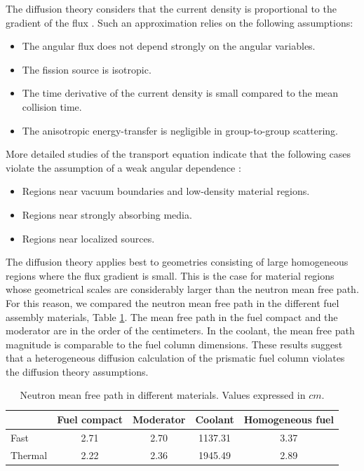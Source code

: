 \documentclass[11pt,letterpaper]{article}
\begin{document}
The diffusion theory considers that the current density is proportional to the gradient of the flux \cite{leppanen_development_2007}.
Such an approximation relies on the following assumptions:
\begin{itemize}
	\item The angular flux does not depend strongly on the angular variables.
	\item The fission source is isotropic.
	\item The time derivative of the current density is small compared to the mean collision time.
	\item The anisotropic energy-transfer is negligible in group-to-group scattering.
\end{itemize}

More detailed studies of the transport equation indicate that the following cases violate the assumption of a weak angular dependence \cite{duderstadt_nuclear_1976}:
\begin{itemize}
    \item Regions near vacuum boundaries and low-density material regions.
    \item Regions near strongly absorbing media.
    \item Regions near localized sources.
\end{itemize}

The diffusion theory applies best to geometries consisting of large homogeneous regions where the flux gradient is small.
This is the case for material regions whose geometrical scales are considerably larger than the neutron mean free path.
For this reason, we compared the neutron mean free path in the different fuel assembly materials, Table \ref{tab:mfp}.
The mean free path in the fuel compact and the moderator are in the order of the centimeters.
In the coolant, the mean free path magnitude is comparable to the fuel column dimensions.
These results suggest that a heterogeneous diffusion calculation of the prismatic fuel column violates the diffusion theory assumptions.

\begin{table}[htbp!]
  \centering
  \caption{Neutron mean free path in different materials. Values expressed in $cm$.}
  \begin{tabular}{l|cccc}
  \toprule
              & Fuel compact  & Moderator  & Coolant  & Homogeneous fuel \\
  \midrule
  Fast  		& 2.71 & 2.70 & 1137.31 & 3.37 \\
  Thermal		& 2.22 & 2.36 & 1945.49 & 2.89 \\

  \bottomrule
  \end{tabular}
  \label{tab:mfp}
\end{table}
\end{document}
